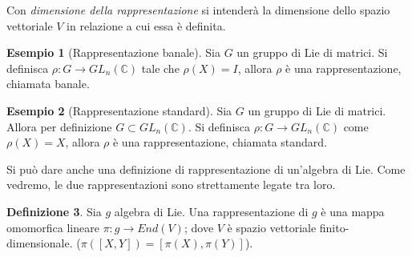 \documentclass[12pt,a4paper]{report}
\theoremstyle{definition}
\newtheorem{Def}{Definizione}[chapter]
\theoremstyle{definition}
\newtheorem{Ex}[Def]{Esempio}
\theoremstyle{definition}
\theoremstyle{definition}
\begin{document}
Con \textit{dimensione della rappresentazione} si intenderà la dimensione dello spazio vettoriale $V$ in relazione a cui essa è definita.
\begin{Ex}[Rappresentazione banale]
	Sia $G$ un gruppo di Lie di matrici. Si definisca $\rho: G\rightarrow GL_n(\mathbb{C})$ tale che $\rho(X)=I$, allora $\rho$ è una rappresentazione, chiamata banale. 
\end{Ex}
\begin{Ex}[Rappresentazione standard]
	Sia $G$ un gruppo di Lie di matrici. Allora per definizione $G\subset GL_n(\mathbb{C})$. Si definisca $\rho: G\rightarrow GL_n(\mathbb{C})$ come $\rho(X)=X$, allora $\rho$ è una rappresentazione, chiamata standard. 
\end{Ex}
Si può dare anche una definizione di rappresentazione di un'algebra di Lie. Come vedremo, le due rappresentazioni sono strettamente legate tra loro.
\begin{Def}
	Sia $g$ algebra di Lie. Una rappresentazione di $g$ è una mappa omomorfica lineare $\pi:g\rightarrow End(V)$; dove $V$ è spazio vettoriale finito-dimensionale. ($\pi([X,Y])=[\pi(X),\pi(Y)]$).
\end{Def}
\end{document}
